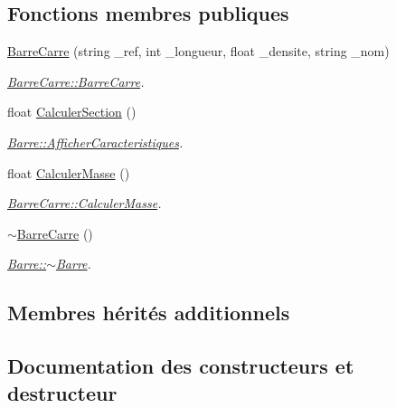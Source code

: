 \subsection*{Fonctions membres publiques}
\begin{DoxyCompactItemize}
\item 
\hyperlink{class_barre_carre_ac0467aa6898dc560bee6d711b214da38}{Barre\+Carre} (string \+\_\+ref, int \+\_\+longueur, float \+\_\+densite, string \+\_\+nom)
\begin{DoxyCompactList}\small\item\em \hyperlink{class_barre_carre_ac0467aa6898dc560bee6d711b214da38}{Barre\+Carre\+::\+Barre\+Carre}. \end{DoxyCompactList}\item 
float \hyperlink{class_barre_carre_a521fa890549009143b4cd1fc0d20ba47}{Calculer\+Section} ()
\begin{DoxyCompactList}\small\item\em \hyperlink{class_barre_a2e844be9d7c76a74d61cb14243a1bade}{Barre\+::\+Afficher\+Caracteristiques}. \end{DoxyCompactList}\item 
float \hyperlink{class_barre_carre_ad290f96b7657082e3995c091a41a7a74}{Calculer\+Masse} ()
\begin{DoxyCompactList}\small\item\em \hyperlink{class_barre_carre_ad290f96b7657082e3995c091a41a7a74}{Barre\+Carre\+::\+Calculer\+Masse}. \end{DoxyCompactList}\item 
\hyperlink{class_barre_carre_a82339da142c13e06c3e464612dce0a42}{$\sim$\+Barre\+Carre} ()
\begin{DoxyCompactList}\small\item\em \hyperlink{class_barre_adc603c73952d56885cad1cc1acad578f}{Barre\+::$\sim$\+Barre}. \end{DoxyCompactList}\end{DoxyCompactItemize}
\subsection*{Membres hérités additionnels}


\subsection{Documentation des constructeurs et destructeur}
\mbox{\label{class_barre_carre_ac0467aa6898dc560bee6d711b214da38}} 
